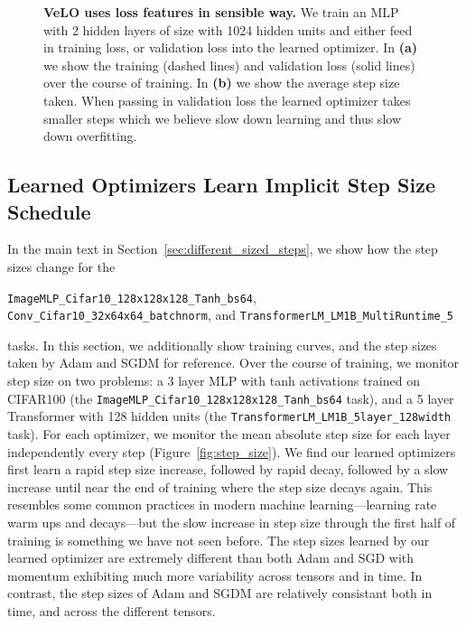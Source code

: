\documentclass[11pt]{article}
\begin{document}
\begin{figure}[t!]
    \centering
    \caption{\textbf{VeLO uses loss features in sensible way.} We train an MLP with 2 hidden layers of size with 1024 hidden units and either feed in training loss, or validation loss into the learned optimizer.
    In \textbf{(a)} we show the training (dashed lines) and validation loss (solid lines) over the course of training.
    In \textbf{(b)} we show the average step size taken.
    When passing in validation loss the learned optimizer takes smaller steps which we believe slow down learning and thus slow down overfitting.
    \label{fig:loss_features_generalize}
    }
\end{figure}

\subsection{Learned Optimizers Learn Implicit Step Size Schedule} \label{app:additional_step_size}
In the main text in Section~\ref{sec:different_sized_steps}, we show how the step sizes change for the 
\begin{center}
\texttt{ImageMLP\_Cifar10\_128x128x128\_Tanh\_bs64}, \texttt{Conv\_Cifar10\_32x64x64\_batchnorm}, and \texttt{TransformerLM\_LM1B\_MultiRuntime\_5} 
\end{center}
tasks. In this section, we additionally show training curves, and the step sizes taken by Adam and SGDM for reference. Over the course of training, we monitor step size on two problems: a 3 layer MLP with tanh activations trained on CIFAR100 (the \texttt{ImageMLP\_Cifar10\_128x128x128\_Tanh\_bs64} task), and a 5 layer Transformer with 128 hidden units (the \texttt{TransformerLM\_LM1B\_5layer\_128width} task).
For each optimizer, we monitor the mean absolute step size for each layer independently every step (Figure~\ref{fig:step_size}).
We find our learned optimizers first learn a rapid step size increase, followed by rapid decay, followed by a slow increase until near the end of training where the step size decays again.
This resembles some common practices in modern machine learning---learning rate warm ups and decays---but the slow increase in step size through the first half of training is something we have not seen before.
The step sizes learned by our learned optimizer are extremely different than both Adam and SGD with momentum exhibiting much more variability across tensors and in time.
In contrast, the step sizes of Adam and SGDM are relatively consistant both in time, and across the different tensors.
\end{document}
